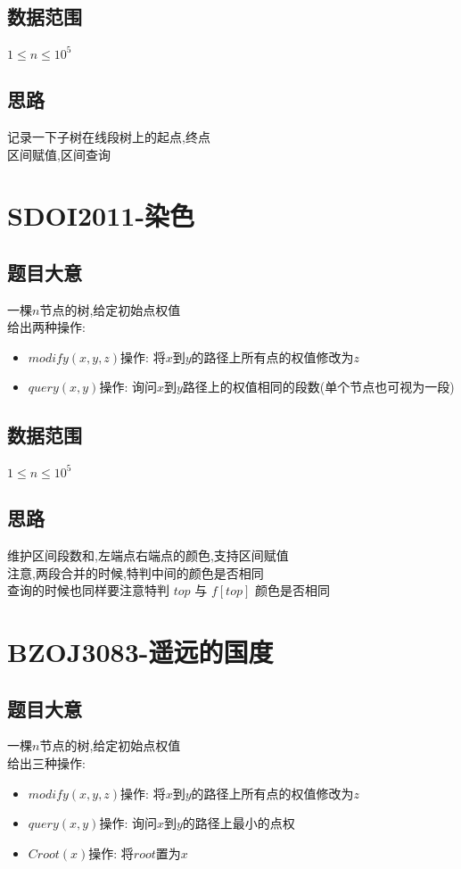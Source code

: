 \documentclass{ctexart}
\numberwithin{equation}{section}
\begin{document}
\begin{flushleft}
  \subsection{数据范围}
  $1\le n\le10^5$\\
  \subsection{思路}
  记录一下子树在线段树上的起点,终点\\
  区间赋值,区间查询\\
  \newpage

  \section{SDOI2011-染色}
  \subsection{题目大意}
  一棵$n$节点的树,给定初始点权值\\
  给出两种操作:\\
  \begin{itemize}
  \item $modify(x,y,z)$操作: 将$x$到$y$的路径上所有点的权值修改为$z$
  \item $query(x,y)$操作: 询问$x$到$y$路径上的权值相同的段数(单个节点也可视为一段)
  \end{itemize}
  \subsection{数据范围}
  $1\le n\le10^5$\\
  \subsection{思路}
  维护区间段数和,左端点右端点的颜色,支持区间赋值\\
  注意,两段合并的时候,特判中间的颜色是否相同\\
  查询的时候也同样要注意特判 $top$ 与 $f[top]$ 颜色是否相同\\
  \newpage

  \section{BZOJ3083-遥远的国度}
  \subsection{题目大意}
  一棵$n$节点的树,给定初始点权值\\
  给出三种操作:\\
  \begin{itemize}
  \item $modify(x,y,z)$操作: 将$x$到$y$的路径上所有点的权值修改为$z$
  \item $query(x,y)$操作: 询问$x$到$y$的路径上最小的点权
  \item $Croot(x)$操作: 将$root$置为$x$
  \end{itemize}

\end{flushleft}
\end{document}
